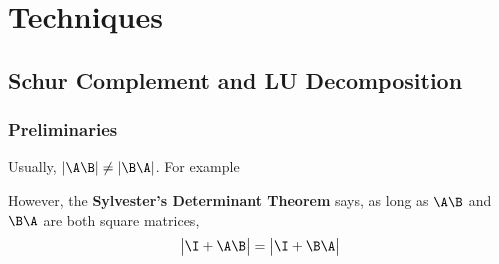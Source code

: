 \part{Techniques}
\chapter{Schur Complement and LU Decomposition}
\section{Preliminaries}
Usually, $|\A\B| \ne |\B\A|$. For example

However, the {\bf{Sylvester's Determinant Theorem}} says, as long as $\A\B$ and $\B\A$ are both square matrices,
\begin{align}
    \begin{vmatrix}\I+\A\B\end{vmatrix} = \begin{vmatrix}\I+\B\A\end{vmatrix}
\end{align}

